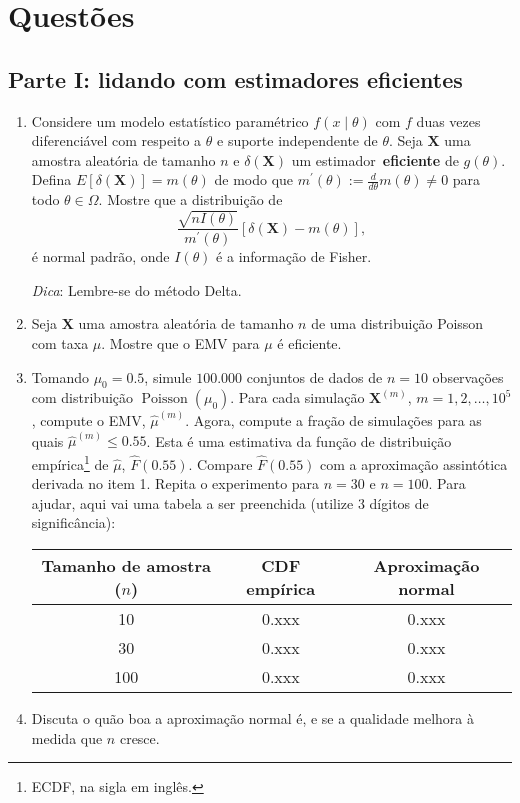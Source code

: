 \documentclass[a4paper,10pt, notitlepage]{report}
\begin{document}
\section*{Questões}

\subsection*{Parte I: lidando com estimadores eficientes}
\begin{enumerate}
 \item Considere um modelo estatístico paramétrico $f(x \mid \theta)$ com $f$ duas vezes diferenciável com respeito a $\theta$ e suporte independente de $\theta$.
 Seja $\boldsymbol{X}$ uma amostra aleatória de tamanho $n$ e $\delta(\boldsymbol{X})$ um estimador~\textbf{eficiente} de $g(\theta)$.
 Defina $E[\delta(\boldsymbol{X})] = m(\theta)$ de modo que $m^\prime(\theta) := \frac{d}{d\theta}m(\theta) \neq 0$ para todo $\theta \in \Omega$.
 Mostre que a distribuição de 
 $$
 \frac{\sqrt{nI(\theta)}}{m^\prime(\theta)}\left[\delta(\boldsymbol{X})-m(\theta)\right],
 $$
 é normal padrão, onde $I(\theta)$ é a informação de Fisher.
 
 \textit{Dica}: Lembre-se do método Delta.
 \item Seja $\boldsymbol{X}$ uma amostra aleatória de tamanho $n$ de uma distribuição Poisson com taxa $\mu$. 
 Mostre que o EMV para $\mu$ é eficiente.
 \item Tomando $\mu_0 = 0.5$, simule $100.000$ conjuntos de dados de $n=10$ observações com distribuição $\operatorname{Poisson}(\mu_0)$.
 Para cada simulação $\boldsymbol{X}^{(m)}$, $m = 1, 2,\ldots, 10^{5}$, compute o EMV, $\hat{\mu}^{(m)}$.
 Agora, compute a fração de simulações para as quais $\hat{\mu}^{(m)} \leq 0.55$.
 Esta é uma estimativa da função de distribuição empírica\footnote{ECDF, na sigla em inglês.} de $\hat{\mu}$, $\hat{F}(0.55)$.
 Compare $\hat{F}(0.55)$ com a aproximação assintótica derivada no item 1.
 Repita o experimento para $n=30$ e $n=100$.
 Para ajudar, aqui vai uma tabela a ser preenchida (utilize 3 dígitos de significância):
\begin{table}[!ht]
\begin{center}
 \begin{tabular}{ccc}
\hline
Tamanho de amostra ($n$) & CDF empírica & Aproximação normal \\ \hline
10 & 0.xxx & 0.xxx \\
30 & 0.xxx & 0.xxx \\
100 & 0.xxx & 0.xxx
\end{tabular}
\end{center}
\end{table}
\item Discuta o quão boa a aproximação normal é, e se a qualidade melhora à medida que $n$ cresce.
\end{enumerate}
\end{document}
